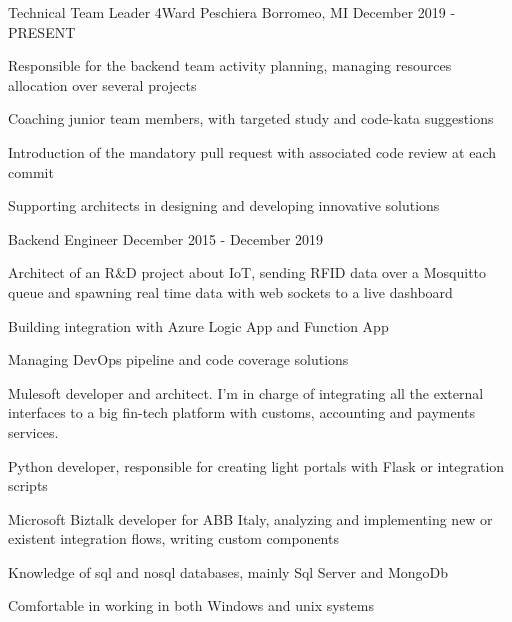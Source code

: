 
\begin{cventries}
  \cventry
    {Technical Team Leader} %
    {4Ward} %
    {Peschiera Borromeo, MI} %
    {December 2019 - PRESENT} %
    {
      \begin{cvitems} %
        \item {Responsible for the backend team activity planning, managing resources allocation over several projects}
        \item {Coaching junior team members, with targeted study and code-kata suggestions}
        \item {Introduction of the mandatory pull request with associated code review at each commit}
        \item {Supporting architects in designing and developing innovative solutions}
      \end{cvitems}
    }
    
  \cventry
    {Backend Engineer} %
    {} %
    {} %
    {December 2015 - December 2019} %
    {
      \begin{cvitems} %
        \item {Architect of an R\&D project about IoT, sending RFID data over a Mosquitto queue and spawning real time data with web sockets to a live dashboard}
        \item {Building integration with Azure Logic App and Function App}
        \item {Managing DevOps pipeline and code coverage solutions}
        \item {Mulesoft developer and architect. I’m in charge of integrating all the external interfaces to a big fin-tech platform with customs, accounting and payments services.}
        \item {Python developer, responsible for creating light portals with Flask or integration scripts}
        \item {Microsoft Biztalk developer for ABB Italy, analyzing and implementing new or existent integration flows, writing custom components }
        \item {Knowledge of sql and nosql databases, mainly Sql Server and MongoDb}
        \item {Comfortable in working in both Windows and unix systems}
      \end{cvitems}
    }


\end{cventries}

